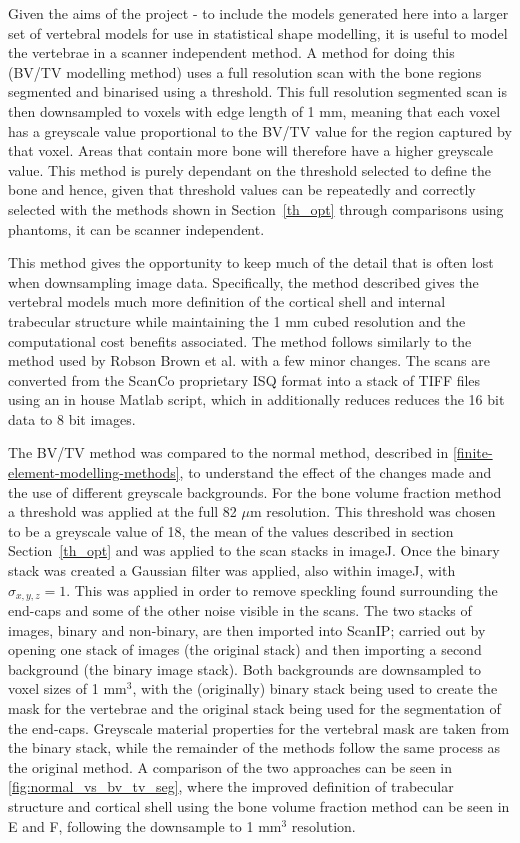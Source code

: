 Given the aims of the project - to include the models generated here into a
larger set of vertebral models for use in statistical shape modelling, it is
useful to model the vertebrae in a scanner independent method. A method for
doing this (BV/TV modelling method) uses a full resolution scan with the bone
regions segmented and binarised using a threshold. This full resolution segmented scan is
then
downsampled to voxels with edge length of 1 mm, meaning that each voxel has a
greyscale value proportional to the BV/TV value for the region captured by that
voxel. Areas that contain more bone will therefore have a higher greyscale
value. This method is purely dependant on the threshold selected to define the
bone and hence, given that threshold values can be repeatedly and correctly
selected with the methods shown in Section~\ref{th_opt} through comparisons using phantoms, it can be scanner independent.



This method gives the opportunity to keep much of the detail that is often lost
when downsampling image data.  Specifically, the method described gives the
vertebral models much more definition of the cortical shell and internal
trabecular structure while maintaining the 1 mm cubed resolution and the
computational cost benefits associated.  The method follows similarly to the method used by Robson Brown et al.  \cite{RobsonBrown2014} with a few
minor changes. The scans are converted from the ScanCo proprietary ISQ format
into a stack of TIFF files using an in house Matlab script, which in
additionally reduces reduces the 16 bit data to 8 bit images.

The BV/TV method was compared to the normal method, described in \cref{finite-element-modelling-methods}, to understand the effect of the changes made and the use of different greyscale backgrounds.  For the bone
volume fraction method a threshold was applied at the full 82 $\mu$m
resolution.  This threshold was chosen to be a greyscale value of 18, the mean
of the values described in section Section~\ref{th_opt} and was applied to the
scan stacks in imageJ.  Once the binary stack was created a Gaussian filter was
applied, also within imageJ, with $ \sigma_{x,y,z} = 1 $.  This was applied in
order to remove speckling found surrounding the end-caps and some of the other
noise visible in the scans.  The two stacks of images, binary and non-binary, are then imported into
ScanIP; carried out by opening one stack of images (the original stack) and
then importing a second background (the binary image stack). Both backgrounds
are downsampled to voxel sizes of 1 mm$^3$, with the (originally) binary stack
being used to create the mask for the vertebrae and the original stack being
used for the segmentation of the end-caps.  Greyscale material properties for the vertebral mask
are taken from the binary stack, while the remainder of the methods follow the
same process as the original method.  A comparison of the two approaches can be
seen in \cref{fig:normal_vs_bv_tv_seg}, where the improved definition of
trabecular structure and cortical shell using the bone volume fraction method
can be seen in E and F, following the downsample to 1 mm$^3$ resolution.


